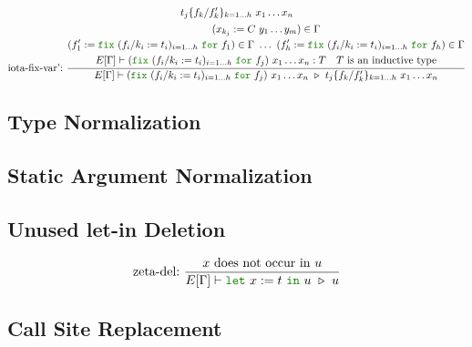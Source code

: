 \documentclass[a4paper,fleqn]{article}
\newcommand{\kwlet}{\mbox{\color{mygreen}\ttfamily let}}
\newcommand{\kwin}{\mbox{\color{mygreen}\ttfamily in}}
\newcommand{\kwfix}{\mbox{\color{mygreen}\ttfamily fix}}
\newcommand{\kwfor}{\mbox{\color{mygreen}\ttfamily for}}
\newcommand{\letin}[3]{\kwlet~#1:=#2~\kwin~#3}
\newcommand{\fix}[4]{\kwfix~(#1 := #2)_{#3}~\kwfor~#4}
\newcommand{\subst}[3]{#1\{#2/#3\}}
\begin{document}
\begin{gather*}
{\begin{aligned}
                  &\quad \subst{t_j}{f_k}{f'_k}_{k=1\dots h} ~x_1 \dots x_n
      \end{aligned}
    } \\
  \text{iota-fix-var':}~
    \dfrac
    {
      \begin{gathered}
        (x_{k_j} := C~y_1\ldots y_m) \in \Gamma \\
        (f'_1 := \fix{f_i/k_i}{t_i}{i=1\dots h}{f_1}) \in \Gamma ~\dots~
        (f'_h := \fix{f_i/k_i}{t_i}{i=1\dots h}{f_h}) \in \Gamma \\
        E[\Gamma] \vdash (\fix{f_i/k_i}{t_i}{i=1\dots h}{f_j})~x_1\ldots x_n : T \quad
        \text{$T$ is an inductive type}
      \end{gathered}
    }{
      E[\Gamma] \vdash
      (\fix{f_i/k_i}{t_i}{i=1\dots h}{f_j})~x_1\ldots x_n
      ~\triangleright~
      \subst{t_j}{f_k}{f'_k}_{k=1\dots h} ~x_1 \dots x_n
    }
\end{gather*}

\subsection{Type Normalization}\label{sec:type-normalization}
\subsection{Static Argument Normalization}\label{sec:static-argument-normalization}
\subsection{Unused let-in Deletion}\label{sec:let-in-deletion}
\begin{gather*}
  \text{zeta-del:}~
    \dfrac{
      \text{$x$ does not occur in $u$}
    }{E[\Gamma] \vdash \letin{x}{t}{u}
                       ~\triangleright~
                       u
    }
\end{gather*}

\subsection{Call Site Replacement}\label{sec:call-site-replacement}
\end{document}
